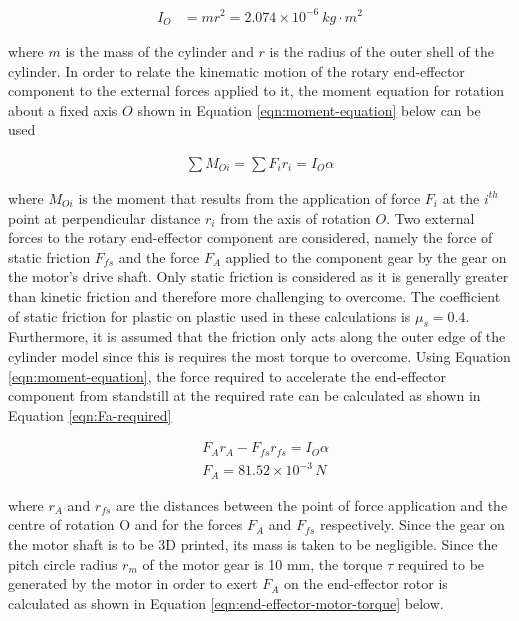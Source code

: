 \begin{align}
	I_O&=mr^2=2.074 \times 10^{-6} \: kg\cdot m^2
	\label{eqn:moment-of-inertia} 
\end{align}

where $m$ is the mass of the cylinder and $r$ is the radius of the outer shell of the cylinder. In order to relate the kinematic motion of the rotary end-effector component to the external forces applied to it, the moment equation for rotation about a fixed axis $O$ shown in Equation \ref{eqn:moment-equation} below can be used

\begin{align}
	\sum M_{Oi} =\sum F_i r_i = I_O \alpha
	\label{eqn:moment-equation}
\end{align}

where $M_{Oi}$ is the moment that results from the application of force $F_i$ at the $i^{th}$ point at perpendicular distance $r_i$ from the axis of rotation $O$. Two external forces to the rotary end-effector component are considered, namely the force of static friction $F_{fs}$ and the force $F_A$ applied to the component gear by the gear on the motor's drive shaft. Only static friction is considered as it is generally greater than kinetic friction and therefore more challenging to overcome. The coefficient of static friction for plastic on plastic used in these calculations is $\mu _s = 0.4$. Furthermore, it is assumed that the friction only acts along the outer edge of the cylinder model since this is requires the most torque to overcome. Using Equation \ref{eqn:moment-equation}, the force required to accelerate the end-effector component from standstill at the required rate can be calculated as shown in Equation \ref{eqn:Fa-required}

\begin{align}
	&F_A r_A - F_{fs} r_{fs} = I_O \alpha
	\label{eqn:Fa-required} \\
	&F_A = 81.52 \times 10^{-3} \, N
\end{align}

where $r_A$ and $r_{fs}$ are the distances between the point of force application and the centre of rotation O and for the forces $F_A$ and $F_{fs}$ respectively. Since the gear on the motor shaft is to be 3D printed, its mass is taken to be negligible. Since the pitch circle radius $r_m$ of the motor gear is 10 mm, the torque $\tau$ required to be generated by the motor in order to exert $F_A$ on the end-effector rotor is calculated as shown in Equation \ref{eqn:end-effector-motor-torque} below.

